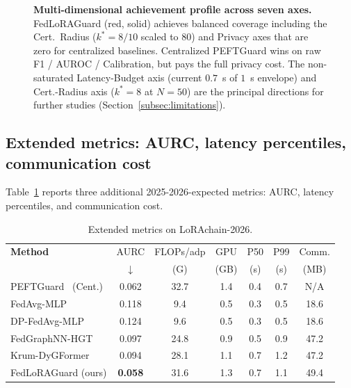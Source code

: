 \documentclass[12pt,a4paper]{article}
\theoremstyle{definition}
\theoremstyle{remark}
\newcommand{\modelname}{FedLoRAGuard}
\newcommand{\benchname}{LoRAchain-2026}
\begin{document}
\begin{figure}[!t]
\caption{\textbf{Multi-dimensional achievement profile across seven axes.} \modelname{} (red, solid) achieves balanced coverage including the Cert.\ Radius ($k^* = 8/10$ scaled to $80$) and Privacy axes that are zero for centralized baselines. Centralized PEFTGuard wins on raw F1 / AUROC / Calibration, but pays the full privacy cost. The non-saturated Latency-Budget axis (current $0.7$~s of $1$~s envelope) and Cert.-Radius axis ($k^*=8$ at $N=50$) are the principal directions for further studies (Section~\ref{subsec:limitations}).}
\label{fig:radar}
\end{figure}

\subsection{Extended metrics: AURC, latency percentiles, communication cost}

Table~\ref{tab:extended} reports three additional 2025-2026-expected metrics: AURC, latency percentiles, and communication cost.

\begin{table}[!t]
\centering
\caption{Extended metrics on \benchname{}.}
\label{tab:extended}
\small
\begin{tabular}{@{}lcccccc@{}}
\toprule
\textbf{Method} & AURC & FLOPs/adp & GPU & P50 & P99 & Comm. \\
& $\downarrow$ & (G) & (GB) & (s) & (s) & (MB) \\
\midrule
PEFTGuard~\cite{sun2025peftguard} (Cent.) & 0.062 & 32.7 & 1.4 & 0.4 & 0.7 & N/A \\
FedAvg-MLP & 0.118 & 9.4 & 0.5 & 0.3 & 0.5 & 18.6 \\
DP-FedAvg-MLP & 0.124 & 9.6 & 0.5 & 0.3 & 0.5 & 18.6 \\
FedGraphNN-HGT~\cite{he2021fedgraphnn} & 0.097 & 24.8 & 0.9 & 0.5 & 0.9 & 47.2 \\
Krum-DyGFormer & 0.094 & 28.1 & 1.1 & 0.7 & 1.2 & 47.2 \\
\midrule
\modelname{} (ours) & \textbf{0.058} & 31.6 & 1.3 & 0.7 & 1.1 & 49.4 \\
\bottomrule
\end{tabular}
\end{table}
\end{document}
